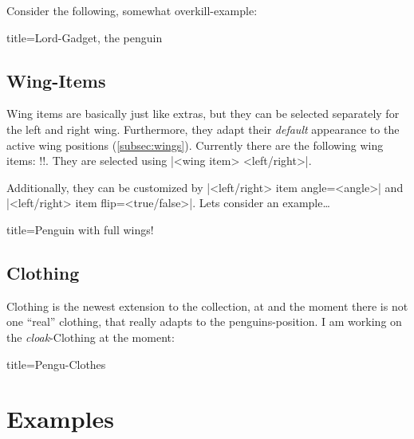 \documentclass[parskip=half,english,noenddot,numbers=noenddot,footnotes=nomultiple,oneside]{scrartcl}
\makeatletter
\let\say\enquote
\def\DTLlistformatitem#1{\textit{#1}}
\newcommand*\typesetselection[1][]{\begingroup\ifx!#1!\else\def\DTLlistformatitem##1{#1}\fi\dotypesetselection}
\def\dotypesetselection#1{\expandafter\DTLformatlist\expandafter{\csname @pingu@#1@\endcsname}\endgroup}
\makeatother
\begin{document}
Consider the following, somewhat overkill-example:
\begin{tcblisting}{title={Lord-Gadget, the penguin}}
\begin{tikzpicture}
	\pingu[crown 2d=pingu@bronze,
	       medal=pingu@purple, tie,
	       eye patch left=teal,
	       eye patch right=orange,
	       right wing wave, sunglasses,
	       glow thick=yellow]
\end{tikzpicture}
\end{tcblisting}

\subsection{Wing-Items}
Wing items are basically just like extras, but they can be selected separately for the left and right wing. Furthermore, they adapt their \textit{default} appearance to the active wing positions (\autoref{subsec:wings}).
Currently there are the following wing items:
\typesetselection{wingitems}.
They are selected using |<wing item> <left/right>|.

Additionally, they can be customized by |<left/right> item angle=<angle>| and |<left/right> item flip=<true/false>|.
Lets consider an example\ldots
\begin{tcblisting}{title={Penguin with full wings!}}
\begin{tikzpicture}[scale=.75]
	\pingu[lightsaber right=orange,
	  lollipop left,
	  right item angle=70,
	  right wing raise, left wing grab]
	\pingu[cane left, right item flip,
	  sign post right={Hi!}, xshift=35mm]
\end{tikzpicture}
\end{tcblisting}

\subsection{Clothing}
Clothing is the newest extension to the collection, at and the moment there is not one \say{real} clothing, that really adapts to the penguins-position.
I am working on the \textit{cloak}-Clothing at the moment:
\begin{tcblisting}{title={Pengu-Clothes}}
\begin{tikzpicture}[scale=.75]
	\pingu[cloak]
\end{tikzpicture}
\end{tcblisting}

\section{Examples}
\end{document}
